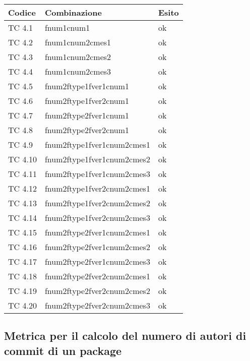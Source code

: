 \begin{tabular}{|p{3cm}|p{7cm}|p{3cm}|}
	\hline
	\rowcolor{Gray}
	\textbf{Codice} & \textbf{Combinazione} & \textbf{Esito}\tabularnewline
	\hline
	TC 4.1			& fnum1cnum1			& ok \tabularnewline
	\hline
	TC 4.2			& fnum1cnum2cmes1		& ok \tabularnewline
	\hline
	TC 4.3			& fnum1cnum2cmes2		& ok \tabularnewline
	\hline
	TC 4.4			& fnum1cnum2cmes3		& ok \tabularnewline
	\hline
	TC 4.5			& fnum2ftype1fver1cnum1		& ok \tabularnewline
	\hline
	TC 4.6			& fnum2ftype1fver2cnum1		& ok \tabularnewline
	\hline
	TC 4.7			& fnum2ftype2fver1cnum1		& ok \tabularnewline
	\hline
	TC 4.8			& fnum2ftype2fver2cnum1		& ok \tabularnewline
	\hline
	TC 4.9			& fnum2ftype1fver1cnum2cmes1	& ok \tabularnewline
	\hline
	TC 4.10			& fnum2ftype1fver1cnum2cmes2	& ok \tabularnewline
	\hline
	TC 4.11			& fnum2ftype1fver1cnum2cmes3	& ok \tabularnewline
	\hline
	TC 4.12			& fnum2ftype1fver2cnum2cmes1	& ok \tabularnewline
	\hline
	TC 4.13			& fnum2ftype1fver2cnum2cmes2	& ok \tabularnewline
	\hline
	TC 4.14			& fnum2ftype1fver2cnum2cmes3	& ok \tabularnewline
	\hline
	TC 4.15			& fnum2ftype2fver1cnum2cmes1	& ok \tabularnewline
	\hline
	TC 4.16			& fnum2ftype2fver1cnum2cmes2	& ok \tabularnewline
	\hline
	TC 4.17			& fnum2ftype2fver1cnum2cmes3	& ok \tabularnewline
	\hline
	TC 4.18			& fnum2ftype2fver2cnum2cmes1	& ok \tabularnewline
	\hline
	TC 4.19			& fnum2ftype2fver2cnum2cmes2	& ok \tabularnewline
	\hline
	TC 4.20			& fnum2ftype2fver2cnum2cmes3	& ok \tabularnewline
	\hline
\end{tabular}
\clearpage




\subsection{Metrica per il calcolo del numero di autori di commit di un package}

